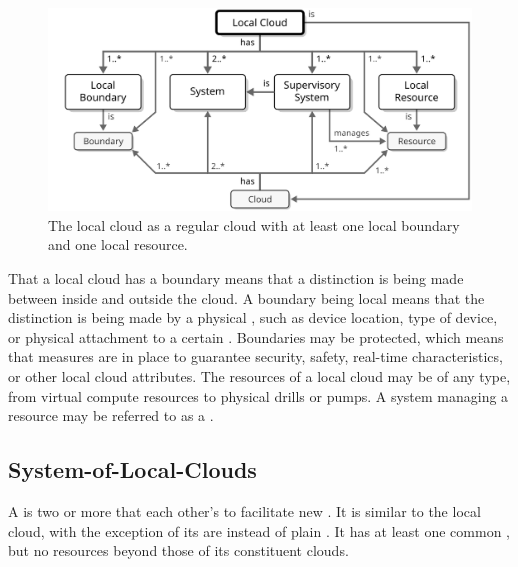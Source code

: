 \begin{figure}[ht!]
  \centering
  \includegraphics[scale=0.9]{figures/local-cloud}
  \caption{
    The local cloud as a regular cloud with at least one local boundary and one local resource.
  }
  \label{fig:local-cloud}
\end{figure}

That a local cloud has a boundary means that a distinction is being made between  inside and outside the cloud.
A boundary being local means that the distinction is being made by a physical , such as device location, type of device, or physical attachment to a certain .
Boundaries may be protected, which means that measures are in place to guarantee security, safety, real-time characteristics, or other local cloud attributes.
The resources of a local cloud may be of any type, from virtual compute resources to physical drills or pumps.
A system managing a resource may be referred to as a .

\subsection{System-of-Local-Clouds}
\label{sec:concepts:solc}

A  is two or more  that  each other's  to facilitate new .
It is similar to the local cloud, with the exception of its  are  instead of plain .
It has at least one common , but no resources beyond those of its constituent clouds.

